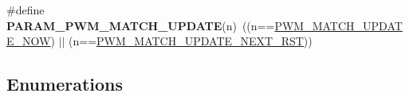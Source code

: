 \begin{DoxyCompactItemize}
\item 
\hypertarget{group___p_w_m___public___types_ga0523e3caec799dd6882871f3b3b3c0d0}{\#define {\bfseries \-P\-A\-R\-A\-M\-\_\-\-P\-W\-M\-\_\-\-M\-A\-T\-C\-H\-\_\-\-U\-P\-D\-A\-T\-E}(n)~((n==\hyperlink{group___p_w_m___public___types_gga2fc566cd8e98b29646e97659db77f51ba37f7b5e91d86013c2feebc4ba400ad89}{\-P\-W\-M\-\_\-\-M\-A\-T\-C\-H\-\_\-\-U\-P\-D\-A\-T\-E\-\_\-\-N\-O\-W}) $|$$|$ (n==\hyperlink{group___p_w_m___public___types_gga2fc566cd8e98b29646e97659db77f51ba0eb9c69641c3636ffd8ac21a26e83477}{\-P\-W\-M\-\_\-\-M\-A\-T\-C\-H\-\_\-\-U\-P\-D\-A\-T\-E\-\_\-\-N\-E\-X\-T\-\_\-\-R\-S\-T}))}\label{group___p_w_m___public___types_ga0523e3caec799dd6882871f3b3b3c0d0}

\end{DoxyCompactItemize}
\subsection*{\-Enumerations}
